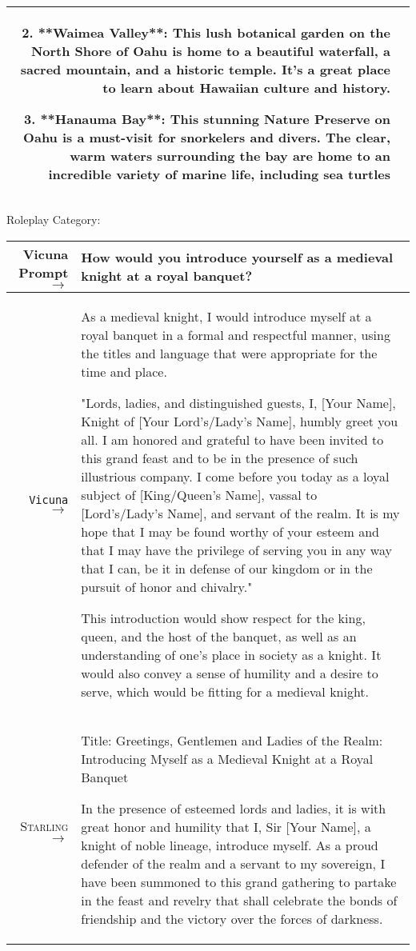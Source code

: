 \documentclass{article}
\newlength\mydepth
\newcommand{\starlingemojititle}{\textsc{Starling}\raisebox{-\mydepth}{\texttt{[image: images/starling-final.png]}}}
\begin{document}
{{\begin{tabularx}{\linewidth}{r X}
2. **Waimea Valley**: This lush botanical garden on the North Shore of Oahu is home to a beautiful waterfall, a sacred mountain, and a historic temple. It's a great place to learn about Hawaiian culture and history.

3. **Hanauma Bay**: This stunning Nature Preserve on Oahu is a must-visit for snorkelers and divers. The clear, warm waters surrounding the bay are home to an incredible variety of marine life, including sea turtles

\\
 \bottomrule
 \end{tabularx} }

\newpage
Roleplay Category:

{  \footnotesize \begin{tabularx}{\linewidth}{r X} \toprule Vicuna Prompt $\to$ & {\bf How would you introduce yourself as a medieval knight at a royal banquet?}
\\
 \midrule \texttt{Vicuna} $\to$ &
As a medieval knight, I would introduce myself at a royal banquet in a formal and respectful manner, using the titles and language that were appropriate for the time and place.

"Lords, ladies, and distinguished guests, I, [Your Name], Knight of [Your Lord's/Lady's Name], humbly greet you all. I am honored and grateful to have been invited to this grand feast and to be in the presence of such illustrious company. I come before you today as a loyal subject of [King/Queen's Name], vassal to [Lord's/Lady's Name], and servant of the realm. It is my hope that I may be found worthy of your esteem and that I may have the privilege of serving you in any way that I can, be it in defense of our kingdom or in the pursuit of honor and chivalry."

This introduction would show respect for the king, queen, and the host of the banquet, as well as an understanding of one's place in society as a knight. It would also convey a sense of humility and a desire to serve, which would be fitting for a medieval knight.
\\
 \midrule \starlingemojititle{} $\to$ &
Title: Greetings, Gentlemen and Ladies of the Realm: Introducing Myself as a Medieval Knight at a Royal Banquet

In the presence of esteemed lords and ladies, it is with great honor and humility that I, Sir [Your Name], a knight of noble lineage, introduce myself. As a proud defender of the realm and a servant to my sovereign, I have been summoned to this grand gathering to partake in the feast and revelry that shall celebrate the bonds of friendship and the victory over the forces of darkness.


\end{tabularx}}}
\end{document}
